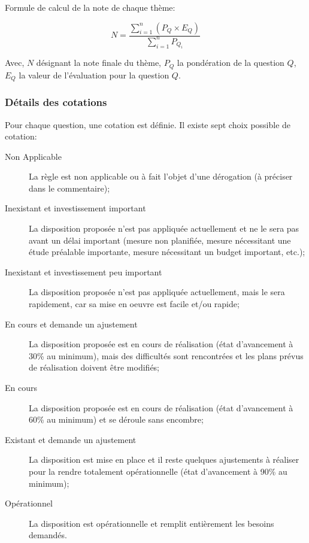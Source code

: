 Formule de calcul de la note de chaque thème:

$$ N=\frac{\sum_{i=1}^{n}{\left( P_Q \times E_Q \right)}}{\sum_{i=1}^{n}{P_{Q_i}}} $$

Avec, \textbf{$N$} désignant la note finale du thème, \textbf{$P_Q$} la pondération de la question \textbf{$Q$}, \textbf{$E_Q$} la valeur de l'évaluation pour la question \textbf{$Q$}.

\subsubsection{Détails des cotations}

Pour chaque question, une cotation est définie. Il existe sept choix possible de cotation:

\begin{description}
	\item[Non Applicable] La règle est non applicable ou à fait l'objet d'une dérogation (à préciser dans le commentaire);
	\item[Inexistant et investissement important] La disposition proposée n'est pas appliquée actuellement et ne le sera pas avant un délai important (mesure non planifiée, mesure nécessitant une étude préalable importante, mesure nécessitant un budget important, etc.);
	\item[Inexistant et investissement peu important] La disposition proposée n'est pas appliquée actuellement, mais le sera rapidement, car sa mise en oeuvre est facile et/ou rapide;
	\item[En cours et demande un ajustement] La disposition proposée est en cours de réalisation (état d'avancement à 30\% au minimum), mais des difficultés sont rencontrées et les plans prévus de réalisation doivent être modifiés;
	\item[En cours] La disposition proposée est en cours de réalisation (état d'avancement à 60\% au minimum) et se déroule sans encombre;
	\item[Existant et demande un ajustement] La disposition est mise en place et il reste quelques ajustements à réaliser pour la rendre totalement opérationnelle (état d'avancement à 90\% au minimum);
	\item[Opérationnel] La disposition est opérationnelle et remplit entièrement les besoins demandés.
 \end{description}
